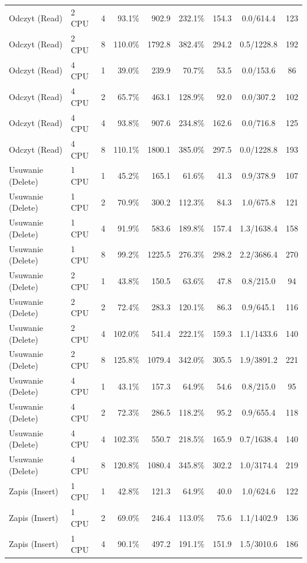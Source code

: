 \begin{table}[ht]
{\begin{tabular}{llcrrrrcc}
Odczyt (Read) & 2 CPU & 4 & 93.1\% & 902.9 & 232.1\% & 154.3 & 0.0/614.4 & 123 \\
Odczyt (Read) & 2 CPU & 8 & 110.0\% & 1792.8 & 382.4\% & 294.2 & 0.5/1228.8 & 192 \\
Odczyt (Read) & 4 CPU & 1 & 39.0\% & 239.9 & 70.7\% & 53.5 & 0.0/153.6 & 86 \\
Odczyt (Read) & 4 CPU & 2 & 65.7\% & 463.1 & 128.9\% & 92.0 & 0.0/307.2 & 102 \\
Odczyt (Read) & 4 CPU & 4 & 93.8\% & 907.6 & 234.8\% & 162.6 & 0.0/716.8 & 125 \\
Odczyt (Read) & 4 CPU & 8 & 110.1\% & 1800.1 & 385.0\% & 297.5 & 0.0/1228.8 & 193 \\
Usuwanie (Delete) & 1 CPU & 1 & 45.2\% & 165.1 & 61.6\% & 41.3 & 0.9/378.9 & 107 \\
Usuwanie (Delete) & 1 CPU & 2 & 70.9\% & 300.2 & 112.3\% & 84.3 & 1.0/675.8 & 121 \\
Usuwanie (Delete) & 1 CPU & 4 & 91.9\% & 583.6 & 189.8\% & 157.4 & 1.3/1638.4 & 158 \\
Usuwanie (Delete) & 1 CPU & 8 & 99.2\% & 1225.5 & 276.3\% & 298.2 & 2.2/3686.4 & 270 \\
Usuwanie (Delete) & 2 CPU & 1 & 43.8\% & 150.5 & 63.6\% & 47.8 & 0.8/215.0 & 94 \\
Usuwanie (Delete) & 2 CPU & 2 & 72.4\% & 283.3 & 120.1\% & 86.3 & 0.9/645.1 & 116 \\
Usuwanie (Delete) & 2 CPU & 4 & 102.0\% & 541.4 & 222.1\% & 159.3 & 1.1/1433.6 & 140 \\
Usuwanie (Delete) & 2 CPU & 8 & 125.8\% & 1079.4 & 342.0\% & 305.5 & 1.9/3891.2 & 221 \\
Usuwanie (Delete) & 4 CPU & 1 & 43.1\% & 157.3 & 64.9\% & 54.6 & 0.8/215.0 & 95 \\
Usuwanie (Delete) & 4 CPU & 2 & 72.3\% & 286.5 & 118.2\% & 95.2 & 0.9/655.4 & 118 \\
Usuwanie (Delete) & 4 CPU & 4 & 102.3\% & 550.7 & 218.5\% & 165.9 & 0.7/1638.4 & 140 \\
Usuwanie (Delete) & 4 CPU & 8 & 120.8\% & 1080.4 & 345.8\% & 302.2 & 1.0/3174.4 & 219 \\
Zapis (Insert) & 1 CPU & 1 & 42.8\% & 121.3 & 64.9\% & 40.0 & 1.0/624.6 & 122 \\
Zapis (Insert) & 1 CPU & 2 & 69.0\% & 246.4 & 113.0\% & 75.6 & 1.1/1402.9 & 136 \\
Zapis (Insert) & 1 CPU & 4 & 90.1\% & 497.2 & 191.1\% & 151.9 & 1.5/3010.6 & 186 \\

\end{tabular}}
\end{table}
